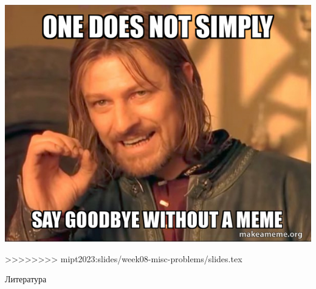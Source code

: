 \documentclass[11pt,aspectratio=169,handout]{beamer}
\begin{document}
\begin{frame}
\begin{center}
\includegraphics[scale=0.55]{images/bye.jpeg}
\end{center}
>>>>>>>> mipt2023:slides/week08-misc-problems/slides.tex
\end{frame}

\begin{frame}[allowframebreaks]{Литература}




\end{frame}
\end{document}
